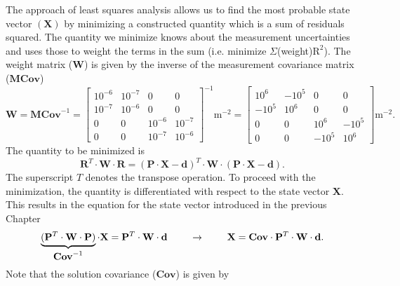 The approach of least squares analysis allows us to find the most probable state vector $(\mathbf{X})$ by minimizing a constructed quantity which is a sum of residuals squared.  The quantity we minimize knows about the measurement uncertainties and uses those to weight the terms in the sum (i.e. minimize $\Sigma$(weight)$\text{R}^2$).  The weight matrix ($\mathbf{W}$) is given by the inverse of the measurement covariance matrix ($\mathbf{MCov}$)
\begin{equation}
\mathbf{W}=\mathbf{MCov}^{-1}=\left[\begin{array}{cccc}10^{-6}&10^{-7}&0&0\\10^{-7}&10^{-6}&0&0\\0&0&10^{-6}&10^{-7}\\0&0&10^{-7}&10^{-6}\end{array}\right]^{-1}\text{m}^{-2}=\left[\begin{array}{cccc}10^6&-10^5&0&0\\-10^5&10^6&0&0\\0&0&10^6&-10^5\\0&0&-10^5&10^6\end{array}\right]\text{m}^{-2}.
\end{equation}
The quantity to be minimized is
\begin{equation}
\mathbf{R}^T\cdot\mathbf{W}\cdot\mathbf{R}=(\mathbf{P}\cdot\mathbf{X}-\mathbf{d})^T\cdot\mathbf{W}\cdot(\mathbf{P}\cdot\mathbf{X}-\mathbf{d}).
\end{equation}
The superscript $T$ denotes the transpose operation.  To proceed with the minimization, the quantity is differentiated with respect to the state vector $\mathbf{X}$.  This results in the equation for the state vector introduced in the previous Chapter
\begin{equation}
\mathop{\underbrace{(\mathbf{P}^T\cdot\mathbf{W}\cdot\mathbf{P})}_{\displaystyle{\mathbf{Cov}^{-1}}}}\cdot\mathbf{X}=\mathbf{P}^T\cdot\mathbf{W}\cdot\mathbf{d}\hspace*{8mm}\rightarrow\hspace*{8mm}\mathbf{X}=\mathbf{Cov}\cdot\mathbf{P}^T\cdot\mathbf{W}\cdot\mathbf{d}.
\end{equation}
Note that the solution covariance ($\mathbf{Cov}$) is given by
